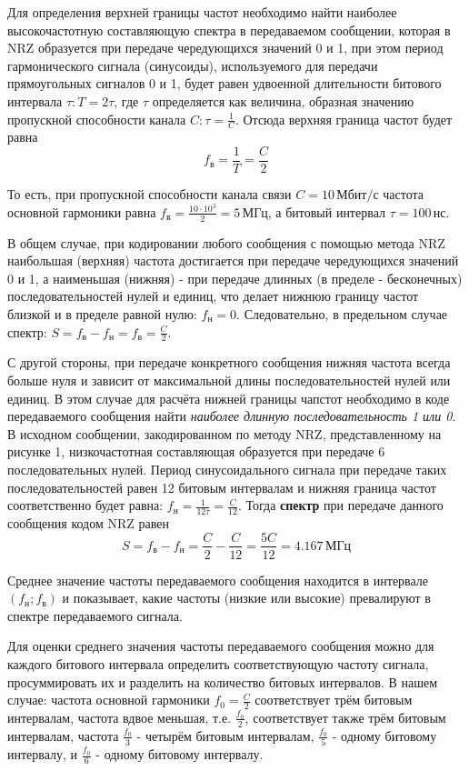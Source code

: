Для определения верхней границы частот необходимо найти наиболее высокочастотную составляющую спектра в передаваемом сообщении, которая в NRZ образуется при передаче чередующихся значений 0 и 1, при этом период гармонического сигнала (синусоиды), используемого для передачи прямоугольных сигналов 0 и 1, будет равен удвоенной длительности битового интервала $\tau: T = 2\tau$, где $\tau$ определяется как величина, образная значению пропускной способности канала $C: \tau = \frac{1}{C}$. Отсюда верхняя граница частот будет равна \[f_{\text{в}} = \frac{1}{T} = \frac{C}{2}\]

То есть, при пропускной способности канала связи $C = 10 \, \text{Мбит/с}$ частота основной гармоники равна $f_{\text{в}} = \frac{10 \cdot 10^3}{2} = 5 \, \text{МГц}$, а битовый интервал $\tau = 100 \, \text{нс}$.

В общем случае, при кодировании любого сообщения с помощью метода NRZ наибольшая (верхняя) частота достигается при передаче чередующихся значений 0 и 1, а наименьшая (нижняя) - при передаче длинных (в пределе - бесконечных) последовательностей нулей и единиц, что делает нижнюю границу частот близкой и в пределе равной нулю: $f_{\text{н}} = 0$. Следовательно, в предельном случае спектр: $S = f_{\text{в}} - f_{\text{н}} = f_{\text{в}} = \frac{C}{2}$.

С другой стороны, при передаче конкретного сообщения нижняя частота всегда больше нуля и зависит от максимальной длины последовательностей нулей или единиц. В этом случае для расчёта нижней границы чапстот необходимо в коде передаваемого сообщения найти \textit{наиболее длинную последовательность 1 или 0}. В исходном сообщении, закодированном по методу NRZ, представленному на рисунке 1, низкочастотная составляющая образуется при передаче 6 последовательных нулей. Период синусоидального сигнала при передаче таких последовательностей равен 12 битовым интервалам и нижняя граница частот соответственно будет равна: $f_{\text{н}} = \frac{1}{12\tau} = \frac{C}{12}$. Тогда \textbf{спектр} при передаче данного сообщения кодом NRZ равен
\[
	S =  f_{\text{в}} - f_{\text{н}} = \frac{C}{2} - \frac{C}{12} = \frac{5C}{12} = 4.167 \, \text{МГц}
\]

Среднее значение частоты передаваемого сообщения находится в интервале $(f_{\text{н}};f_{\text{в}})$ и показывает, какие частоты (низкие или высокие) превалируют в спектре передаваемого сигнала.

Для оценки среднего значения частоты передаваемого сообщения можно для каждого битового интервала определить соответствующую частоту сигнала, просуммировать их и разделить на количество битовых интервалов. В нашем случае: частота основной гармоники $f_0 = \frac{C}{2}$ соответствует трём битовым интервалам, частота вдвое меньшая, т.е. $\frac{f_0}{2}$, соответствует также трём битовым интервалам, частота $\frac{f_0}{3}$ - четырём битовым интервалам, $\frac{f_0}{5}$ - одному битовому интервалу, и $\frac{f_0}{6}$ - одному битовому интервалу.

